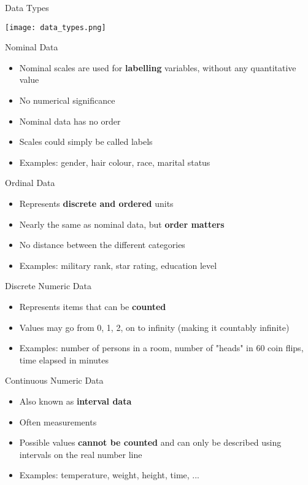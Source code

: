 \begin{theorem}{Data Types}
    
    \texttt{[image: data\_types.png]}
\end{theorem}

\begin{corollary}{Nominal Data}
    \begin{itemize}
        \item Nominal scales are used for \textbf{labelling} variables, without any quantitative value
        \item No numerical significance
        \item Nominal data has no order
        \item Scales could simply be called labels
        \item Examples: gender, hair colour, race, marital status
    \end{itemize}
\end{corollary}

\begin{corollary}{Ordinal Data}
    \begin{itemize}
        \item Represents \textbf{discrete and ordered} units
        \item Nearly the same as nominal data, but \textbf{order matters}
        \item No distance between the different categories
        \item Examples: military rank, star rating, education level
    \end{itemize}
\end{corollary}

\begin{corollary}{Discrete Numeric Data}
    \begin{itemize}
        \item Represents items that can be \textbf{counted}
        \item Values may go from 0, 1, 2, on to infinity (making it countably infinite)
        \item Examples: number of persons in a room, number of "heads" in 60 coin flips, time elapsed in minutes
    \end{itemize}
\end{corollary}

\begin{corollary}{Continuous Numeric Data}
    \begin{itemize}
        \item Also known as \textbf{interval data}
        \item Often measurements
        \item Possible values \textbf{cannot be counted} and can only be described using intervals on the real number line
        \item Examples: temperature, weight, height, time, ...
    \end{itemize}
\end{corollary}